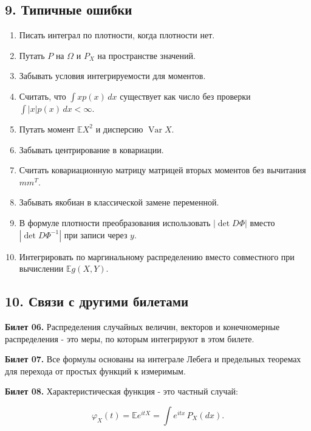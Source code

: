 \documentclass[
  11pt,
  a4paper,
]{article}
\providecommand{\tightlist}{%
  \setlength{\itemsep}{0pt}\setlength{\parskip}{0pt}}
\begin{document}
\subsection{9. Типичные
ошибки}\label{ux442ux438ux43fux438ux447ux43dux44bux435-ux43eux448ux438ux431ux43aux438}

\begin{enumerate}
\def\labelenumi{\arabic{enumi}.}
\tightlist
\item
  Писать интеграл по плотности, когда плотности нет.
\item
  Путать \(P\) на \(\Omega\) и \(P_X\) на пространстве значений.
\item
  Забывать условия интегрируемости для моментов.
\item
  Считать, что \(\int xp(x)\,dx\) существует как число без проверки
  \(\int |x|p(x)\,dx<\infty\).
\item
  Путать момент \(\mathbb EX^2\) и дисперсию \(\operatorname{Var}X\).
\item
  Забывать центрирование в ковариации.
\item
  Считать ковариационную матрицу матрицей вторых моментов без вычитания
  \(mm^T\).
\item
  Забывать якобиан в классической замене переменной.
\item
  В формуле плотности преобразования использовать \(|\det D\Phi|\)
  вместо \(|\det D\Phi^{-1}|\) при записи через \(y\).
\item
  Интегрировать по маргинальному распределению вместо совместного при
  вычислении \(\mathbb E g(X,Y)\).
\end{enumerate}

\subsection{10. Связи с другими
билетами}\label{ux441ux432ux44fux437ux438-ux441-ux434ux440ux443ux433ux438ux43cux438-ux431ux438ux43bux435ux442ux430ux43cux438}

\textbf{Билет 06.} Распределения случайных величин, векторов и
конечномерные распределения - это меры, по которым интегрируют в этом
билете.

\textbf{Билет 07.} Все формулы основаны на интеграле Лебега и предельных
теоремах для перехода от простых функций к измеримым.

\textbf{Билет 08.} Характеристическая функция - это частный случай:

\[
\varphi_X(t)=\mathbb E e^{itX}
=
\int e^{itx}\,P_X(dx).
\]
\end{document}

